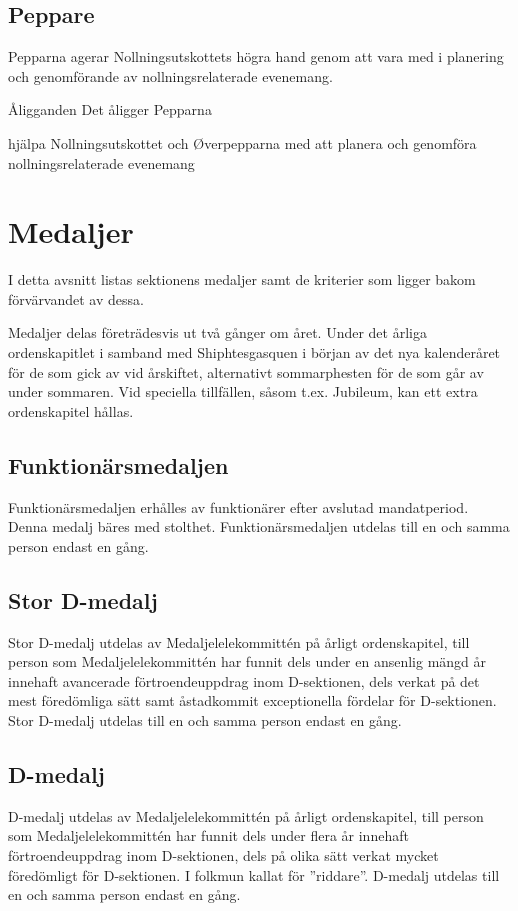 \documentclass[pdfbookmarks,a4paper,11pt]{article}
\newcommand{\funktionar}[1]{%
  \subsection*{#1}\par
  \addcontentsline{toc}{subsection}{#1}}
\newlength{\itemcollength}
\newenvironment{reglemlista}{%
  \begin{list}{}{%
      \setlength{\labelwidth}{\itemcollength}%
      \setlength{\leftmargin}{\labelwidth + \labelsep}%
      \renewcommand{\makelabel}[1]{%
        \raisebox{0pt}[1ex][0pt]{%
          \makebox[\labelwidth][l]{%
            \parbox[t]{\itemcollength}{%
              \raggedright\hspace{0pt}##1}}}\hfill}%
      }}{%
  \end{list}}
\begin{document}
\funktionar{Peppare}
Pepparna agerar Nollningsutskottets högra hand genom att vara med i planering
och genomförande av nollningsrelaterade evenemang.
\begin{reglemlista}
	\item[Åligganden]
	Det åligger Pepparna
	\begin{attlista}
		\item hjälpa Nollningsutskottet och \O verpepparna med att planera och genomföra nollningsrelaterade evenemang
	\end{attlista}

\end{reglemlista}

\section{Medaljer}

I detta avsnitt listas sektionens medaljer samt de kriterier som ligger bakom förvärvandet av dessa.

Medaljer delas företrädesvis ut två gånger om året. Under det årliga ordenskapitlet i samband med Shiphtesgasquen i början av det nya kalenderåret för de som gick av vid årskiftet, alternativt sommarphesten för de som går av under sommaren. Vid speciella tillfällen, såsom t.ex. Jubileum, kan ett extra ordenskapitel hållas.

\subsection{Funktionärsmedaljen}
Funktionärsmedaljen erhålles av funktionärer efter avslutad mandatperiod. Denna medalj bäres med stolthet. Funktionärsmedaljen utdelas till en och samma person endast en gång.

\subsection{Stor D-medalj}
Stor D-medalj utdelas av Medaljelelekommittén på årligt ordenskapitel, till person som Medaljelelekommittén har funnit dels under en ansenlig mängd år innehaft avancerade förtroendeuppdrag inom D-sektionen, dels verkat på det mest föredömliga sätt samt åstadkommit exceptionella fördelar för D-sektionen. Stor D-medalj utdelas till en och samma person endast en gång.

\subsection{D-medalj}
D-medalj utdelas av Medaljelelekommittén på årligt ordenskapitel, till person som Medaljelelekommittén har funnit dels under flera år innehaft förtroendeuppdrag inom D-sektionen, dels på olika sätt verkat mycket föredömligt för D-sektionen. I folkmun kallat för ''riddare''. D-medalj utdelas till en och samma person endast en gång.
\end{document}
